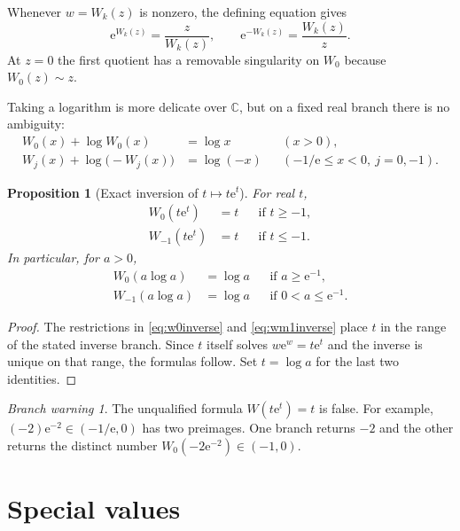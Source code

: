 \documentclass[11pt,oneside]{book}
\newtheorem{proposition}[theorem]{Proposition}
\theoremstyle{definition}
\theoremstyle{remark}
\newtheorem{warning}[theorem]{Branch warning}
\newcommand{\ee}{\mathrm e}
\newcommand{\C}{\mathbb C}
\begin{document}
Whenever $w=W_k(z)$ is nonzero, the defining equation gives
\begin{equation}\label{eq:expW}
  \ee^{W_k(z)}=\frac{z}{W_k(z)},
  \qquad
  \ee^{-W_k(z)}=\frac{W_k(z)}{z}.
\end{equation}
At $z=0$ the first quotient has a removable singularity on $W_0$ because
$W_0(z)\sim z$.

Taking a logarithm is more delicate over $\C$, but on a fixed real branch
there is no ambiguity:
\begin{align}
 W_0(x)+\log W_0(x)&=\log x &&(x>0),\label{eq:logpositive}\\
 W_j(x)+\log\bigl(-W_j(x)\bigr)&=\log(-x)
 &&(-1/\ee\le x<0,\ j=0,-1).\label{eq:lognegative}
\end{align}

\begin{proposition}[Exact inversion of $t\mapsto t\ee^t$]\label{prop:branchselect}
For real $t$,
\begin{align}
 W_0(t\ee^t)&=t &&\text{if }t\ge-1,\label{eq:w0inverse}\\
 W_{-1}(t\ee^t)&=t &&\text{if }t\le-1.\label{eq:wm1inverse}
\end{align}
In particular, for $a>0$,
\begin{align}
 W_0(a\log a)&=\log a &&\text{if }a\ge\ee^{-1},\label{eq:alogaplus}\\
 W_{-1}(a\log a)&=\log a &&\text{if }0<a\le\ee^{-1}.
\label{eq:alogaminus}
\end{align}
\end{proposition}

\begin{proof}
The restrictions in \eqref{eq:w0inverse} and \eqref{eq:wm1inverse} place $t$
in the range of the stated inverse branch.  Since $t$ itself solves
$w\ee^w=t\ee^t$ and the inverse is unique on that range, the formulas follow.
Set $t=\log a$ for the last two identities.
\end{proof}

\begin{warning}
The unqualified formula $W(t\ee^t)=t$ is false.  For example,
$(-2)\ee^{-2}\in(-1/\ee,0)$ has two preimages.  One branch returns $-2$ and
the other returns the distinct number $W_0(-2\ee^{-2})\in(-1,0)$.
\end{warning}

\section{Special values}
\end{document}
